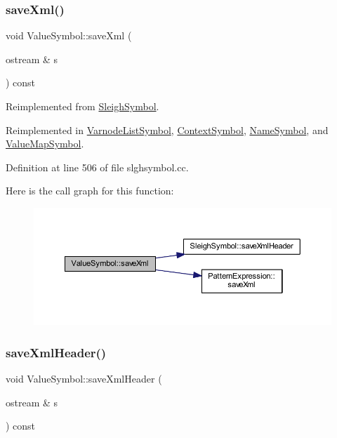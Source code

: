\subsubsection{\texorpdfstring{saveXml()}{saveXml()}}
{\footnotesize\ttfamily void Value\+Symbol\+::save\+Xml (\begin{DoxyParamCaption}\item[{ostream \&}]{s }\end{DoxyParamCaption}) const\hspace{0.3cm}{\ttfamily [virtual]}}



Reimplemented from \mbox{\hyperlink{class_sleigh_symbol_a83c9a32d16419d2277c5b9d542e1cf13}{Sleigh\+Symbol}}.



Reimplemented in \mbox{\hyperlink{class_varnode_list_symbol_a4b95e5f5b2c0ebd4a0eee076c9ed96de}{Varnode\+List\+Symbol}}, \mbox{\hyperlink{class_context_symbol_ad8c4f39c37d11ed5f0fd7bf4eb59dca6}{Context\+Symbol}}, \mbox{\hyperlink{class_name_symbol_a0f97f18cff09e4c67e8bb8d54c392031}{Name\+Symbol}}, and \mbox{\hyperlink{class_value_map_symbol_aacceef585b6af757603b310a7173b860}{Value\+Map\+Symbol}}.



Definition at line 506 of file slghsymbol.\+cc.

Here is the call graph for this function\+:
\nopagebreak
\begin{figure}[H]
\begin{center}
\leavevmode
\includegraphics[width=350pt]{class_value_symbol_aa7b4012d522c5864aea52486b0d47978_cgraph}
\end{center}
\end{figure}
\mbox{\label{class_value_symbol_a7b1c84bd9d7e84f9272d448d10c31200}} 
\subsubsection{\texorpdfstring{saveXmlHeader()}{saveXmlHeader()}}
{\footnotesize\ttfamily void Value\+Symbol\+::save\+Xml\+Header (\begin{DoxyParamCaption}\item[{ostream \&}]{s }\end{DoxyParamCaption}) const\hspace{0.3cm}{\ttfamily [virtual]}}



